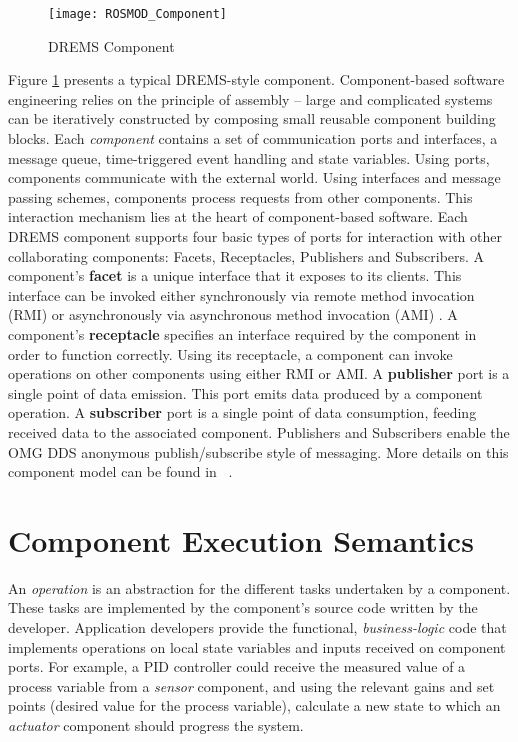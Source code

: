 \begin{figure}[h]
	\centering
	\texttt{[image: ROSMOD\_Component]}
	\caption{DREMS Component}
	\label{fig:DREMS_Component}
\end{figure}


Figure \ref{fig:DREMS_Component} presents a typical DREMS-style component. Component-based software engineering relies on the principle of assembly -- large and complicated systems can be iteratively constructed by composing small reusable component building blocks. Each \emph{component} contains a set of communication ports and interfaces, a message queue, time-triggered event handling and state variables. Using ports, components communicate with the external world. Using interfaces and message passing schemes, components process requests from other components. This interaction mechanism lies at the heart of component-based software. Each DREMS component supports four basic types of ports for interaction with other collaborating components: Facets, Receptacles, Publishers and Subscribers. A component's {\bf facet} is a unique interface that it exposes to its clients. This interface can be invoked either synchronously via remote method invocation (RMI) or asynchronously via asynchronous method invocation (AMI) \cite{waldo1998remote, raje1997asynchronous}. A component's {\bf receptacle} specifies an interface required by the component in order to function correctly. Using its receptacle, a component can invoke operations on other components using either RMI or AMI. A {\bf publisher} port is a single point of data emission. This port emits data produced by a component operation. A {\bf subscriber} port is a single point of data consumption, feeding received data to the associated component. Publishers and Subscribers enable the OMG DDS anonymous publish/subscribe \cite{eugster2003many} style of messaging. More details on this component model can be found in ~\cite{ISIS_F6_ISORC:13}.

\section{Component Execution Semantics}

An \emph{operation} is an abstraction for the different tasks undertaken by a component. These tasks are implemented by the component's source code written by the developer. Application developers provide the functional, \emph{business-logic} code that implements operations on local state variables and inputs received on component ports. For example, a PID controller \cite{aastrom2006advanced} could receive the measured value of a process variable from a \emph{sensor} component, and using the relevant gains and set points (desired value for the process variable), calculate a new state to which an \emph{actuator} component should progress the system. 

